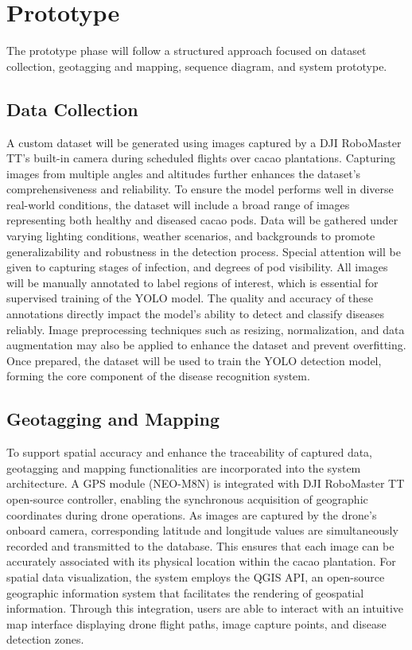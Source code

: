 \section{Prototype}
The prototype phase will follow a structured approach focused on dataset collection, geotagging and mapping, sequence diagram, and system prototype.

\subsection{Data Collection}
A custom dataset will be generated using images captured by a DJI RoboMaster TT’s built-in camera during scheduled flights over cacao plantations. Capturing images from multiple angles and altitudes further enhances the dataset’s comprehensiveness and reliability. To ensure the model performs well in diverse real-world conditions, the dataset will include a broad range of images representing both healthy and diseased cacao pods. Data will be gathered under varying lighting conditions, weather scenarios, and backgrounds to promote generalizability and robustness in the detection process. Special attention will be given to capturing stages of infection, and degrees of pod visibility. All images will be manually annotated to label regions of interest, which is essential for supervised training of the YOLO model. The quality and accuracy of these annotations directly impact the model’s ability to detect and classify diseases reliably. Image preprocessing techniques such as resizing, normalization, and data augmentation may also be applied to enhance the dataset and prevent overfitting. Once prepared, the dataset will be used to train the YOLO detection model, forming the core component of the disease recognition system.

\subsection{Geotagging and Mapping}
To support spatial accuracy and enhance the traceability of captured data, geotagging and mapping functionalities are incorporated into the system architecture. A GPS module (NEO-M8N) is integrated with DJI RoboMaster TT open-source controller, enabling the synchronous acquisition of geographic coordinates during drone operations. As images are captured by the drone’s onboard camera, corresponding latitude and longitude values are simultaneously recorded and transmitted to the database. This ensures that each image can be accurately associated with its physical location within the cacao plantation. For spatial data visualization, the system employs the QGIS API, an open-source geographic information system that facilitates the rendering of geospatial information. Through this integration, users are able to interact with an intuitive map interface displaying drone flight paths, image capture points, and disease detection zones.

